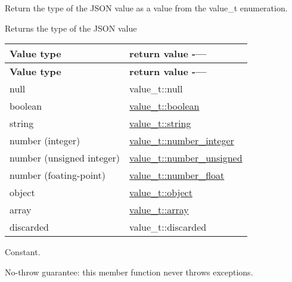 Return the type of the J\+S\+ON value as a value from the value\+\_\+t enumeration.

\begin{DoxyReturn}{Returns}
the type of the J\+S\+ON value \tabulinesep=1mm
\begin{longtabu} spread 0pt [c]{*{2}{|X[-1]}|}
\hline
\rowcolor{\tableheadbgcolor}\textbf{ Value type  }&\textbf{ return value -\/---   }\\
\endfirsthead
\hline
\endfoot
\hline
\rowcolor{\tableheadbgcolor}\textbf{ Value type  }&\textbf{ return value -\/---   }\\
\endhead
null  &value\+\_\+t\+::null   \\
boolean  &\mbox{\hyperlink{namespacenlohmann_1_1detail_a90aa5ef615aa8305e9ea20d8a947980fa84e2c64f38f78ba3ea5c905ab5a2da27}{value\+\_\+t\+::boolean}}   \\
string  &\mbox{\hyperlink{namespacenlohmann_1_1detail_a90aa5ef615aa8305e9ea20d8a947980fab45cffe084dd3d20d928bee85e7b0f21}{value\+\_\+t\+::string}}   \\
number (integer)  &\mbox{\hyperlink{namespacenlohmann_1_1detail_a90aa5ef615aa8305e9ea20d8a947980fa5763da164f8659d94a56e29df64b4bcc}{value\+\_\+t\+::number\+\_\+integer}}   \\
number (unsigned integer)  &\mbox{\hyperlink{namespacenlohmann_1_1detail_a90aa5ef615aa8305e9ea20d8a947980fadce7cc8ec29055c4158828921f2f265e}{value\+\_\+t\+::number\+\_\+unsigned}}   \\
number (foating-\/point)  &\mbox{\hyperlink{namespacenlohmann_1_1detail_a90aa5ef615aa8305e9ea20d8a947980fad9966ecb59667235a57b4b999a649eef}{value\+\_\+t\+::number\+\_\+float}}   \\
object  &\mbox{\hyperlink{namespacenlohmann_1_1detail_a90aa5ef615aa8305e9ea20d8a947980faa8cfde6331bd59eb2ac96f8911c4b666}{value\+\_\+t\+::object}}   \\
array  &\mbox{\hyperlink{namespacenlohmann_1_1detail_a90aa5ef615aa8305e9ea20d8a947980faf1f713c9e000f5d3f280adbd124df4f5}{value\+\_\+t\+::array}}   \\
discarded  &value\+\_\+t\+::discarded   \\
\end{longtabu}

\end{DoxyReturn}
Constant.

No-\/throw guarantee\+: this member function never throws exceptions.

